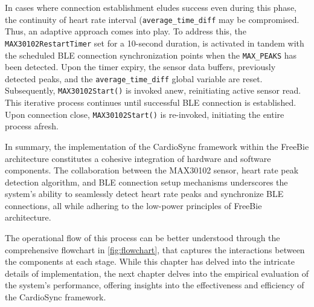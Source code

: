 \noindent In cases where connection establishment eludes success even during this phase, the continuity of heart rate interval (\texttt{average\_time\_diff} may be compromised. Thus, an adaptive approach comes into play. To address this, the \texttt{MAX30102RestartTimer} set for a 10-second duration, is activated in tandem with the scheduled BLE connection synchronization points when the \texttt{MAX\_PEAKS} has been detected. Upon the timer expiry, the sensor data buffers, previously detected peaks, and the \texttt{average\_time\_diff} global variable are reset. Subsequently, \texttt{MAX30102Start()} is invoked anew, reinitiating active sensor read. This iterative process continues until successful BLE connection is established. Upon connection close, \texttt{MAX30102Start()} is re-invoked, initiating the entire process afresh.


\noindent In summary, the implementation of the CardioSync framework within the FreeBie architecture constitutes a cohesive integration of hardware and software components. The collaboration between the MAX30102 sensor, heart rate peak detection algorithm, and BLE connection setup mechanisms underscores the system's ability to seamlessly detect heart rate peaks and synchronize BLE connections, all while adhering to the low-power principles of FreeBie architecture.

\noindent The operational flow of this process can be better understood through the comprehensive flowchart in \autoref{fig:flowchart}, that captures the interactions between the components at each stage. While this chapter has delved into the intricate details of implementation, the next chapter delves into the empirical evaluation of the system's performance, offering insights into the effectiveness and efficiency of the CardioSync framework.

